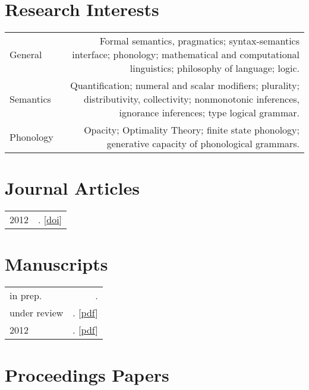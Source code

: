 \documentclass[11pt,letterpaper,twoside]{article}
\makeatletter
\newcommand{\myvrule}{\color{lightgray}\vrule width 1.0pt}
\newenvironment{cvsection}{%
  \renewcommand{\arraystretch}{1.75}
  \begin{longtable}[l]{@{} L R @{}}
}{%
  \end{longtable}
}
\makeatother
\begin{document}
\section*{Research Interests}

\begin{cvsection}
  General & Formal semantics, pragmatics; syntax-semantics interface;
  phonology; mathematical and computational linguistics; philosophy of
  language; logic. \\

  Semantics & Quantification; numeral and scalar modifiers; plurality;
  distributivity, collectivity; nonmonotonic inferences, ignorance inferences;
  type logical grammar. \\

  Phonology & Opacity; Optimality Theory; finite state phonology; generative
  capacity of phonological grammars. \\
\end{cvsection}

\section*{Journal Articles}

\begin{cvsection}
  2012 & \null{}.
  [\href{http://dx.doi.org/10.3765/sp}{doi}] \\
\end{cvsection}

\section*{Manuscripts}

\begin{cvsection}
  in prep. & \null{}. \\

  under review & \null{}.
  [\href{http://people.linguistics.mcgill.ca/~brian.buccola/files/buccola.spector2015maximality.pdf}{pdf}] \\

  2012 & \null{}.
  [\href{http://people.linguistics.mcgill.ca/~brian.buccola/files/buccola2012eval1.pdf}{pdf}] \\
\end{cvsection}

\section*{Proceedings Papers}
\end{document}
